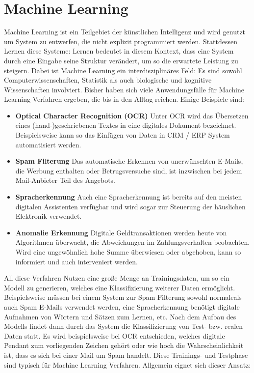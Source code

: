 \section{Machine Learning}

Machine Learning ist ein Teilgebiet der künstlichen Intelligenz und wird genutzt um System zu entwerfen, die nicht explizit programmiert werden. Stattdessen Lernen diese Systeme: Lernen bedeutet in diesem Kontext, dass eine System durch eine Eingabe seine Struktur verändert, um so die erwartete Leistung zu steigern. Dabei ist Machine Learning ein interdisziplinäres Feld: Es sind sowohl Computerwissenschaften, Statistik als auch biologische und kognitive Wissenschaften involviert. Bisher haben sich viele Anwendungsfälle für Machine Learning Verfahren ergeben, die bis in den Alltag reichen. Einige Beispiele sind:

\begin{itemize}
	\item \textbf{Optical Character Recognition (OCR)} Unter OCR wird das Übersetzen eines (hand-)geschriebenen Textes in eine digitales Dokument bezeichnet. Beispielsweise kann so das Einfügen von Daten in CRM / ERP System automatisiert werden.
	\item \textbf{Spam Filterung} Das automatische Erkennen von unerwünschten E-Mails, die Werbung enthalten oder Betrugsversuche sind, ist inzwischen bei jedem Mail-Anbieter Teil des Angebots.
	\item \textbf{Spracherkennung} Auch eine Spracherkennung ist bereits auf den meisten digitalen Assistenten verfügbar und wird sogar zur Steuerung der häuslichen Elektronik verwendet.
	\item \textbf{Anomalie Erkennung} Digitale Geldtransaktionen werden heute von Algorithmen überwacht, die Abweichungen im Zahlungsverhalten beobachten. Wird eine ungewöhnlich hohe Summe überwiesen oder abgehoben, kann so informiert und auch interveniert werden.
\end{itemize}

All diese Verfahren Nutzen eine große Menge an Trainingsdaten, um so ein Modell zu generieren, welches eine Klassifizierung weiterer Daten ermöglicht. Beispielsweise müssen bei einem System zur Spam Filterung sowohl \glqq normale\grqq  als auch Spam E-Mails verwendet werden, eine Spracherkennung benötigt digitale Aufnahmen von Wörtern und Sätzen zum Lernen, etc.
Nach dem Aufbau des Modells findet dann durch das System die Klassifizierung von Test- bzw. realen Daten statt. Es wird beispielsweise bei OCR entschieden, welches digitale Pendant zum vorliegenden Zeichen gehört oder wie hoch die Wahrscheinlichkeit ist, dass es sich bei einer Mail um Spam handelt. Diese Trainings- und Testphase sind typisch für Machine Learning Verfahren. Allgemein eignet sich dieser Ansatz:

